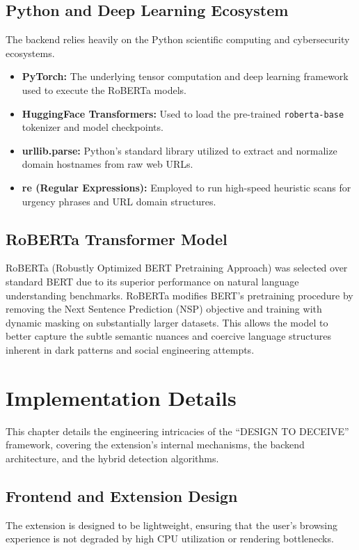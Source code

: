 \documentclass[12pt,a4paper]{report}
\begin{document}
\section{Python and Deep Learning Ecosystem}
The backend relies heavily on the Python scientific computing and cybersecurity ecosystems.
\begin{itemize}
    \item \textbf{PyTorch:} The underlying tensor computation and deep learning framework used to execute the RoBERTa models.
    \item \textbf{HuggingFace Transformers:} Used to load the pre-trained \texttt{roberta-base} tokenizer and model checkpoints.
    \item \textbf{urllib.parse:} Python's standard library utilized to extract and normalize domain hostnames from raw web URLs.
    \item \textbf{re (Regular Expressions):} Employed to run high-speed heuristic scans for urgency phrases and URL domain structures.
\end{itemize}

\section{RoBERTa Transformer Model}
RoBERTa (Robustly Optimized BERT Pretraining Approach) was selected over standard BERT due to its superior performance on natural language understanding benchmarks. RoBERTa modifies BERT's pretraining procedure by removing the Next Sentence Prediction (NSP) objective and training with dynamic masking on substantially larger datasets. This allows the model to better capture the subtle semantic nuances and coercive language structures inherent in dark patterns and social engineering attempts.

\chapter{Implementation Details}

This chapter details the engineering intricacies of the ``DESIGN TO DECEIVE'' framework, covering the extension's internal mechanisms, the backend architecture, and the hybrid detection algorithms.

\section{Frontend and Extension Design}
The extension is designed to be lightweight, ensuring that the user's browsing experience is not degraded by high CPU utilization or rendering bottlenecks.
\end{document}
